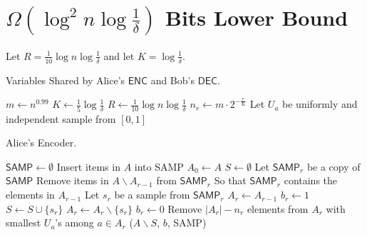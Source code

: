 \documentclass[10pt]{article}
\newcommand{\samp}{\textsf{SAMP}\xspace}
\newcommand{\enc}{\textsf{ENC}\xspace}
\newcommand{\dec}{\textsf{DEC}\xspace}
\begin{document}
\section{$\Omega(\log^2 n \log \frac{1}{\delta})$ Bits Lower Bound}

Let $R=\frac{1}{10}\log n \log \frac{1}{\delta}$ and let $K=\log \frac{1}{\delta}$. 

\begin{algorithm}[H] \label{algo:para}
  \caption{Variables Shared by Alice's $\enc$ and Bob's $\dec$.}
  \begin{algorithmic}[1] 
    \State $m\leftarrow n^{0.99}$
    \State $K\leftarrow \frac{1}{5}\log \frac{1}{\delta}$
    \State $R\leftarrow \frac{1}{10}\log n \log \frac{1}{\delta}$
    \State $n_r\leftarrow m \cdot 2^{-\frac{r}{K}}$
    \EndFor
      \State Let $U_a$ be uniformly and independent sample from $[0,1]$
    \EndFor
  \end{algorithmic}
\end{algorithm}

\begin{algorithm}[H]
  \caption{Alice's Encoder.}
  \begin{algorithmic}[1]
    \Procedure{$\enc$}{$A$}
    \State $\samp \leftarrow \emptyset$
    \State Insert items in $A$ into \samp
    \State $A_0 \leftarrow A$
    \State $S\leftarrow \emptyset$
      \State Let $\samp_r$ be a copy of $\samp$
      \State Remove items in $A\backslash A_{r-1}$ from $\samp_r$ \Comment So that $\samp_r$ contains the elements in $A_{r-1}$
      \State Let $s_r$ be a sample from $\samp_r$
      \State $A_r\leftarrow A_{r-1}$
       
        \State $b_r\leftarrow 1$ 
        \State $S\leftarrow S \cup \{s_r\}$
        \State $A_r\leftarrow A_r \backslash \{s_r\}$
      \Else 
        \State $b_r\leftarrow 0$
      \EndIf
      \State Remove $|A_r|-n_r$ elements from $A_r$ with smallest $U_a$'s among $a\in A_r$ 
    \EndFor
    \State \Return ($A\backslash S$, $b$, \samp) 
    \EndProcedure
  \end{algorithmic}
\end{algorithm}
\end{document}
